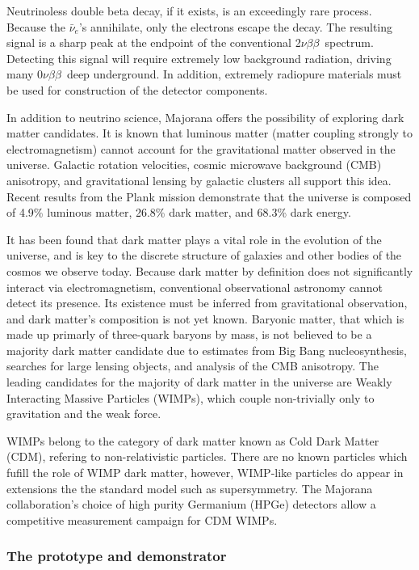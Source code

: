\documentclass[journal]{IEEEtran}
\def\znbb{0$\nu\beta\beta$}
\def\tnbb{2$\nu\beta\beta$}
\def\elanu{$\bar{\nu}_{e}$}
\begin{document}
Neutrinoless double beta decay, if it exists, is an exceedingly rare
process. Because the \elanu's annihilate, only the electrons escape
the decay. The resulting signal is a sharp peak at the endpoint of the
conventional \tnbb\ spectrum. Detecting this signal will require extremely
low background radiation, driving many \znbb\ deep underground. In addition,
extremely radiopure materials must be used for construction of the detector
components.


In addition to neutrino science, Majorana offers the possibility of exploring dark
matter candidates. It is known that luminous matter (matter coupling strongly to electromagnetism) 
cannot account for the gravitational matter observed in the universe. Galactic rotation
velocities, cosmic microwave background (CMB) anisotropy, and gravitational lensing by
galactic clusters all support this idea. Recent results from the Plank mission
demonstrate that the universe is composed of 4.9\% luminous matter, 26.8\% dark matter,
and 68.3\% dark energy.

It has been found that dark matter plays a vital role in the evolution of the universe,
and is key to the discrete structure of galaxies and other bodies of the cosmos we observe
today.
Because dark matter by definition does not significantly interact via electromagnetism,
conventional observational astronomy cannot detect its presence. Its existence must be
inferred from gravitational observation, and dark matter's composition is not yet known.
Baryonic matter, that which is made up primarly of three-quark
baryons by mass, is not believed to be a majority dark matter candidate due to estimates
from Big Bang nucleosynthesis, searches for large lensing objects, and analysis of the
CMB anisotropy.
The leading candidates for the majority of dark matter in the universe are Weakly
Interacting Massive Particles (WIMPs), which couple non-trivially only to gravitation
and the weak force.

WIMPs belong to the category of dark matter known as Cold Dark Matter (CDM), refering
to non-relativistic particles. There are no known particles which fufill the role of
WIMP dark matter, however, WIMP-like particles do appear in extensions the the standard
model such as supersymmetry. The Majorana collaboration's choice of high purity Germanium (HPGe)
detectors allow a competitive measurement campaign for CDM WIMPs.


\subsubsection{The prototype and demonstrator}
\end{document}
